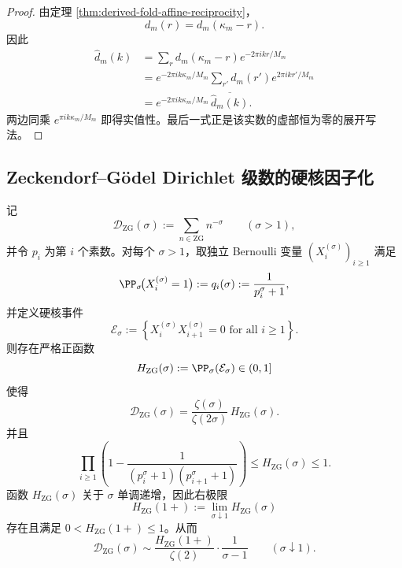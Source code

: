 \documentclass[../../../main.tex]{subfiles}
\begin{document}
\begin{proof}
由定理 \ref{thm:derived-fold-affine-reciprocity}，
\[
d_m(r)=d_m(\kappa_m-r).
\]
因此
\[
\begin{aligned}
\widehat d_m(k)
&=
\sum_{r}d_m(\kappa_m-r)e^{-2\pi i kr/M_m} \\
&=
e^{-2\pi i k\kappa_m/M_m}
\sum_{r'}d_m(r')e^{2\pi i kr'/M_m} \\
&=
e^{-2\pi i k\kappa_m/M_m}\,\overline{\widehat d_m(k)}.
\end{aligned}
\]
两边同乘 \(e^{\pi i k\kappa_m/M_m}\) 即得实值性。最后一式正是该实数的虚部恒为零的展开写法。
\end{proof}

\subsection{Zeckendorf--Gödel Dirichlet 级数的硬核因子化}

\begin{theorem}\label{thm:derived-zg-hardcore-factorization}
记
\[
\mathcal D_{\mathrm{ZG}}(\sigma):=\sum_{n\in \mathrm{ZG}}n^{-\sigma}
\qquad (\sigma>1),
\]
并令 \(p_i\) 为第 \(i\) 个素数。对每个 \(\sigma>1\)，取独立 Bernoulli 变量
\(
(X_i^{(\sigma)})_{i\ge 1}
\)
满足
\[
\PP_{\sigma}\!\bigl(X_i^{(\sigma)}=1\bigr)
:=
q_i(\sigma):=\frac{1}{p_i^{\sigma}+1},
\]
并定义硬核事件
\[
\mathcal E_{\sigma}:=
\left\{
X_i^{(\sigma)}X_{i+1}^{(\sigma)}=0
\text{ for all } i\ge 1
\right\}.
\]
则存在严格正函数
\[
H_{\mathrm{ZG}}(\sigma):=\PP_{\sigma}(\mathcal E_{\sigma})\in (0,1]
\]
使得
\[
\mathcal D_{\mathrm{ZG}}(\sigma)=\frac{\zeta(\sigma)}{\zeta(2\sigma)}\,H_{\mathrm{ZG}}(\sigma).
\]
并且
\[
\prod_{i\ge 1}
\left(
1-\frac{1}{(p_i^{\sigma}+1)(p_{i+1}^{\sigma}+1)}
\right)
\le H_{\mathrm{ZG}}(\sigma)\le 1.
\]
函数 \(H_{\mathrm{ZG}}(\sigma)\) 关于 \(\sigma\) 单调递增，因此右极限
\[
H_{\mathrm{ZG}}(1+):=\lim_{\sigma\downarrow 1}H_{\mathrm{ZG}}(\sigma)
\]
存在且满足 \(0<H_{\mathrm{ZG}}(1+)\le 1\)。从而
\[
\mathcal D_{\mathrm{ZG}}(\sigma)\sim
\frac{H_{\mathrm{ZG}}(1+)}{\zeta(2)}\cdot \frac{1}{\sigma-1}
\qquad (\sigma\downarrow 1).
\]
\end{theorem}
\end{document}
